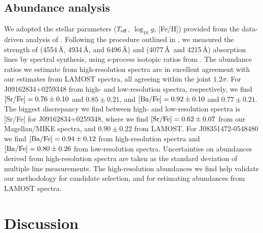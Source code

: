 \documentclass[a4paper,fleqn,usenatbib]{mnras}
\begin{document}
\subsection{Abundance analysis}
We adopted the stellar parameters ($T_{\rm eff}$, $\log_{10}g$, [Fe/H]) provided from the data-driven analysis of \citet{ho2017}. Following the procedure outlined in \citet{casey2014}, we measured the strength of  (4554\,\AA, 4934\,\AA, and 6496\,\AA) and  (4077\,\AA\ and 4215\,\AA) absorption lines by spectral synthesis, using s-process isotopic ratios from \citet{sneden08}. The abundance ratios we estimate from high-resolution spectra are in excellent agreement with our estimates from LAMOST spectra, all agreeing within the joint $1.2\sigma$. For J09162834+0259348 from high- and low-resolution spectra, respectively, we find $[{\rm Sr/Fe}] = 0.76 \pm 0.10$ and $0.85 \pm 0.21$, and $[{\rm Ba/Fe}] = 0.92 \pm 0.10$ and $0.77 \pm 0.21$. The biggest discrepancy we find between high- and low-resolution spectra is [Sr/Fe] for J09162834+0259348, where we find $[{\rm Sr/Fe}] = 0.62 \pm 0.07$ from our Magellan/MIKE spectra, and $0.90 \pm 0.22$ from LAMOST. For J08351472-0548480 we find $[{\rm Ba/Fe}] = 0.94 \pm 0.12$ from high-resolution spectra and $[{\rm Ba/Fe}] = 0.80 \pm 0.26$ from low-resolution spectra. Uncertainties on abundances derived from high-resolution spectra are taken as the standard deviation of multiple line measurements. The high-resolution abundances we find help validate our methodology for candidate selection, and for estimating abundances from LAMOST spectra.




\section{Discussion}  \label{sec:dis}
\end{document}
